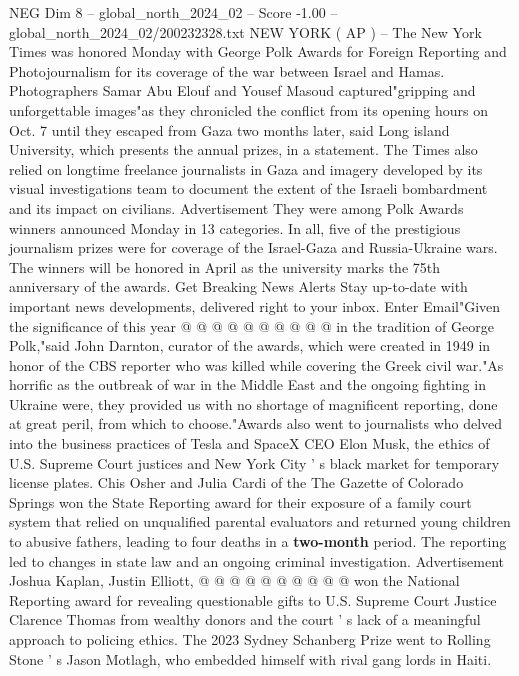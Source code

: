 \begin{textsample}{NEG Dim 8 – global\_north\_2024\_02 – Score -1.00 – global\_north\_2024\_02/200232328.txt}  \label{ex:f8_neg_433}
NEW YORK ( AP ) -- The New York Times was honored Monday with George Polk Awards for Foreign Reporting and Photojournalism for its coverage of the war between Israel and Hamas.
Photographers Samar Abu Elouf and Yousef Masoud captured"gripping and unforgettable images"as they chronicled the conflict from its opening hours on Oct. 7 until they escaped from Gaza two months later, said Long island University, which presents the annual prizes, in a statement.
The Times also relied on longtime freelance journalists in Gaza and imagery developed by its visual investigations team to document the extent of the Israeli bombardment and its impact on civilians.
Advertisement They were among Polk Awards winners announced Monday in 13 categories.
In all, five of the prestigious journalism prizes were for coverage of the Israel-Gaza and Russia-Ukraine wars.
The winners will be honored in April as the university marks the 75th anniversary of the awards.
Get Breaking News Alerts Stay up-to-date with important news developments, delivered right to your inbox.
Enter Email"Given the significance of this year @ @ @ @ @ @ @ @ @ @ in the tradition of George Polk,"said John Darnton, curator of the awards, which were created in 1949 in honor of the CBS reporter who was killed while covering the Greek civil war."As horrific as the outbreak of war in the Middle East and the ongoing fighting in Ukraine were, they provided us with no shortage of magnificent reporting, done at great peril, from which to choose."Awards also went to journalists who delved into the business practices of Tesla and SpaceX CEO Elon Musk, the ethics of U.S.
Supreme Court justices and New York City ' s black market for temporary license plates.
Chis Osher and Julia Cardi of the The Gazette of Colorado Springs won the State Reporting award for their exposure of a family court system that relied on unqualified parental evaluators and returned young children to abusive fathers, leading to four deaths in a \textbf{two-month} period.
The reporting led to changes in state law and an ongoing criminal investigation.
Advertisement Joshua Kaplan, Justin Elliott, @ @ @ @ @ @ @ @ @ @ won the National Reporting award for revealing questionable gifts to U.S.
Supreme Court Justice Clarence Thomas from wealthy donors and the court ' s lack of a meaningful approach to policing ethics.
The 2023 Sydney Schanberg Prize went to Rolling Stone ' s Jason Motlagh, who embedded himself with rival gang lords in Haiti.

\end{textsample}
